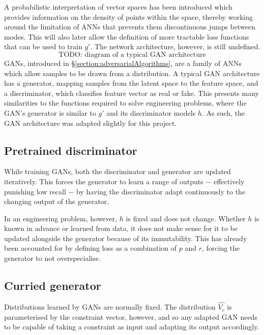 \documentclass[../../main.tex]{subfiles}
\begin{document}
A probabilistic interpretation of vector spaces has been introduced which provides information on the density of points within the space, thereby working around the limitation of ANNs that prevents them discontinuous jumps between modes.
This will also later allow the definition of more tractable loss functions that can be used to train $g'$.
The network architecture, however, is still undefined.
\begin{equation}
	\text{TODO: diagram of a typical GAN architecture}
\end{equation}
GANs, introduced in \S\ref{section:adversarialAlgorithms}, are a family of ANNs which allow samples to be drawn from a distribution.
A typical GAN architecture has a generator, mapping samples from the latent space to the feature space, and a discriminator, which classifies feature vector as real or fake.
This presents many similarities to the functions required to solve engineering problems, where the GAN's generator is similar to $g'$ and its discriminator models $h$.
As such, the GAN architecture was adapted slightly for this project.

\subsection{Pretrained discriminator} \label{subsection:pretrainedDiscriminator}

While training GANs, both the discriminator and generator are updated iteratively.
This forces the generator to learn a range of outputs $-$ effectively punishing low recall $-$ by having the discriminator adapt continuously to the changing output of the generator.

In an engineering problem, however, $h$ is fixed and does not change.
Whether $h$ is known in advance or learned from data, it does not make sense for it to be updated alongside the generator because of its immutability.
This has already been accounted for by defining loss as a combination of $p$ and $r$, forcing the generator to not overspecialise.

\subsection{Curried generator} \label{subsection:curriedGenerator}

Distributions learned by GANs are normally fixed.
The distribution $\hat{V_c}$ is parameterised by the constraint vector, however, and so any adapted GAN needs to be capable of taking a constraint as input and adapting its output accordingly.
\end{document}
